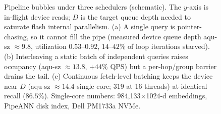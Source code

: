 \begin{figure}[t]
{}
  \caption{Pipeline bubbles under three schedulers (schematic).
    The $y$-axis is in-flight device reads; $D$ is the target queue depth needed to saturate flash internal parallelism.
    (a) A single query is pointer-chasing, so it cannot fill the pipe (measured device queue depth aqu-sz $\approx 9.8$, utilization $0.53$--$0.92$, $14$--$42\%$ of loop iterations starved).
    (b) Interleaving a static batch of independent queries raises occupancy (aqu-sz $\approx 13.8$, $+44\%$ QPS) but a per-hop/group barrier drains the tail.
    (c) Continuous fetch-level batching keeps the device near $D$ (aqu-sz $\approx 14.4$ single core; $319$ at 16 threads) at identical recall ($86.5\%$).
    Single-core numbers: 984{,}133$\times$1024-d embeddings, PipeANN disk index, Dell PM1733a NVMe.}
  \label{fig:pipeline-bubbles}
\end{figure}

